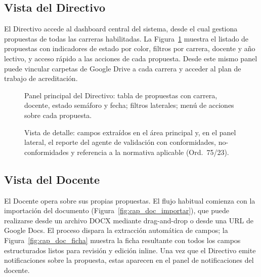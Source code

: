 \subsection{Vista del Directivo}
\label{subsec:cap_directivo}

El Directivo accede al dashboard central del sistema, desde el cual gestiona
propuestas de todas las carreras habilitadas. La Figura~\ref{fig:cap_dir_dashboard}
muestra el listado de propuestas con indicadores de estado por color,
filtros por carrera, docente y año lectivo, y acceso rápido a las acciones
de cada propuesta. Desde este mismo panel puede vincular carpetas de
Google Drive a cada carrera y acceder al plan de trabajo de acreditación.

\begin{figure}[H]
  \centering
  \caption[Dashboard del rol Directivo.]{Panel principal del Directivo:
    tabla de propuestas con carrera, docente, estado semáforo y fecha;
    filtros laterales; menú de acciones sobre cada propuesta.}
  \label{fig:cap_dir_dashboard}
\end{figure}

\begin{figure}[H]
  \centering
  \caption[Vista de propuesta con resultado de validación normativa.]{Vista
    de detalle: campos extraídos en el área principal y, en el panel
    lateral, el reporte del agente de validación con conformidades,
    no-conformidades y referencia a la normativa aplicable (Ord.\ 75/23).}
  \label{fig:cap_dir_propuesta}
\end{figure}

\subsection{Vista del Docente}
\label{subsec:cap_docente}

El Docente opera sobre sus propias propuestas. El flujo habitual comienza
con la importación del documento (Figura~\ref{fig:cap_doc_importar}),
que puede realizarse desde un archivo DOCX mediante drag-and-drop o desde
una URL de Google Docs. El proceso dispara la extracción automática de
campos; la Figura~\ref{fig:cap_doc_ficha} muestra la ficha resultante con
todos los campos estructurados listos para revisión y edición inline.
Una vez que el Directivo emite notificaciones sobre la propuesta, estas
aparecen en el panel de notificaciones del docente.

